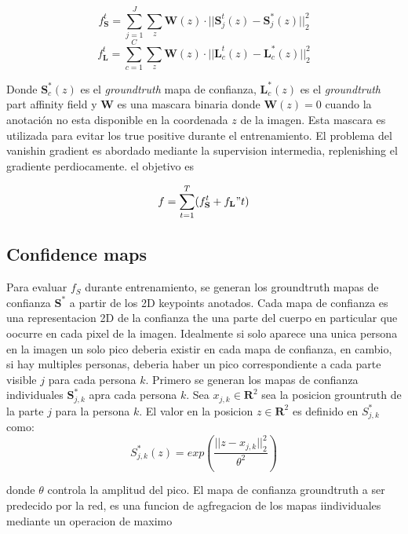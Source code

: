 \documentclass[runningheads]{llncs}
\begin{document}
\begin{equation}
f_{\textbf{S}}^t = \sum_{j=1}^{J} \sum_{z} \textbf{W}(z) \cdot || \textbf{S}_{j}^t(z) - \textbf{S}_{j}^*(z)||_2^2
\end{equation}
\begin{equation}
f_{\textbf{L}}^t = \sum_{c=1}^{C} \sum_{z} \textbf{W}(z) \cdot || \textbf{L}_{c}^t(z) - \textbf{L}_{c}^*(z)||_2^2
\end{equation}

Donde $\textbf{S}_{c}^*(z)$ es el \textit{groundtruth} mapa de confianza, $\textbf{L}_{c}^*(z)$ es el \textit{groundtruth} part affinity field y $\textbf{W}$ es una mascara binaria donde $\textbf{W}(z) = 0$ cuando la anotación no esta disponible en la coordenada $z$ de la imagen. Esta mascara es utilizada para evitar los true positive durante el entrenamiento. El problema del vanishin gradient es abordado mediante la supervision intermedia, replenishing el gradiente perdiocamente. el objetivo es 

\begin{equation}
f = \sum_{t=1}^{T}(f_{\textbf{S}}^t + f_{\textbf{L}}"t)
\end{equation} 


\subsection{Confidence maps}
Para evaluar $f_S$ durante entrenamiento, se generan los groundtruth mapas de confianza $\textbf{S}^*$ a partir de los 2D keypoints anotados. Cada mapa de confianza es una representacion 2D de la confianza the una parte del cuerpo en particular que oocurre en cada pixel de la imagen. Idealmente si solo aparece una unica persona en la imagen un solo pico deberia existir en cada mapa de confianza, en cambio, si hay multiples personas, deberia haber un pico correspondiente a cada parte visible $j$ para cada persona $k$.
Primero se generan los mapas de confianza individuales  $\textbf{S}_{j,k}
^*$ apra cada persona $k$. Sea $x_{j,k} \in \mathbf{R}^2$ sea la posicion grountruth de la parte $j$ para la persona $k$. El valor en la posicion $z \in \mathbf{R}^2$ es definido en $S_{j,k}^*$ como:
\begin{equation}
S_{j,k}^*(z) = exp(\frac{||z - x_{j,k}||_2^2}{\theta^2})
\end{equation}

donde $\theta$ controla la amplitud del pico. El mapa de confianza groundtruth a ser predecido por la red, es una funcion de agfregacion de los mapas iindividuales mediante un operacion de maximo
\end{document}
